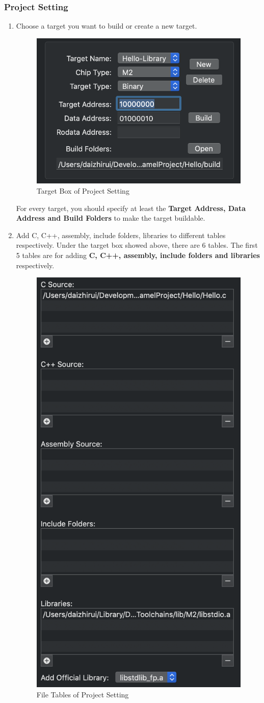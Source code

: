 \documentclass{article}
\begin{document}
		\subsubsection{Project Setting}
			\begin{enumerate}
				\item Choose a target you want to build or create a new target.
					\begin{figure}[!h]
						\centering
						\includegraphics[width=.6\textwidth]{ProjectSetting-1}
						\caption{Target Box of Project Setting}
					\end{figure}
					\newline
					For every target, you should specify at least the \textbf{Target Address, Data Address and Build Folders} to make the target buildable.
					
				\item Add C, C++, assembly, include folders, libraries to different tables respectively.
					\newline
					Under the target box showed above, there are 6 tables. The first 5 tables are for adding \textbf{C, C++, assembly, include folders and libraries} respectively.
					\newpage
					\begin{figure}[!h]
						\centering
						\includegraphics[width=.4\textwidth]{ProjectSetting-2}
						\caption{File Tables of Project Setting}
					\end{figure}
					

\end{enumerate}
\end{document}
